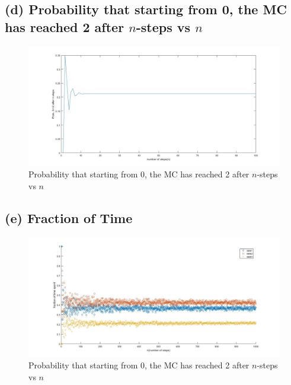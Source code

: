 \documentclass[a4paper,11pt]{report}
\begin{document}
\newpage

\subsection*{(d) Probability that starting from 0, the MC has reached 2 after $n$-steps  vs $ n$}

\begin{figure}[h]
        \includegraphics[scale=0.35]{2d}
        \caption{Probability that starting from 0, the MC has reached 2 after $n$-steps  vs $ n$}
\end{figure}
\newpage

\subsection*{(e) Fraction of Time}

\begin{figure}[h]
        \includegraphics[scale=0.35]{2e}
        \caption{Probability that starting from 0, the MC has reached 2 after $n$-steps  vs $ n$}
\end{figure}
\newpage
\end{document}
